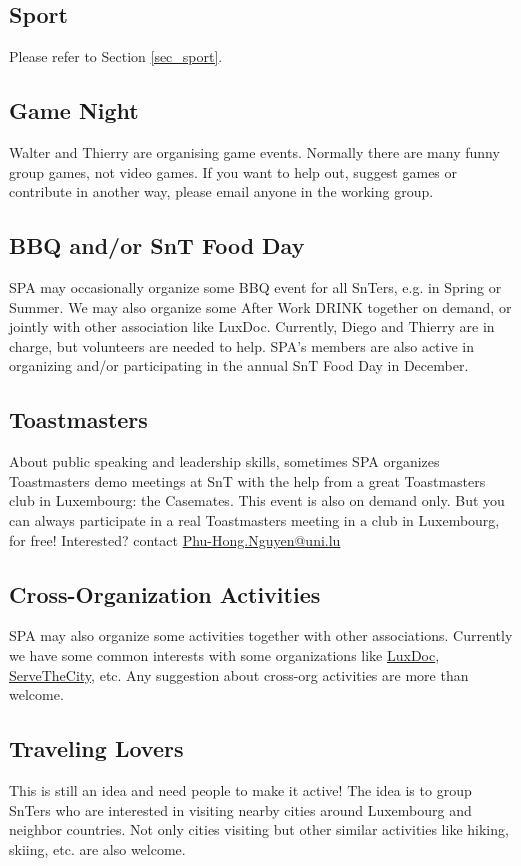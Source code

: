 \subsection{Sport}
Please refer to Section \ref{sec_sport}. 

\subsection{Game Night}
Walter and Thierry are organising game events. 
Normally there are many funny group games, not video games. 
If you want to help out, suggest games or contribute in another way, please email anyone in the working group.

\subsection{BBQ and/or SnT Food Day}
SPA may occasionally organize some BBQ event for all SnTers, e.g. in Spring or Summer. 
We may also organize some After Work DRINK together on demand, or jointly with other association like LuxDoc. 
Currently, Diego and Thierry are in charge, but volunteers are needed to help. 
SPA's members are also active in organizing and/or participating in the annual SnT Food Day in December. 


\subsection{Toastmasters}
About public speaking and leadership skills, sometimes SPA organizes Toastmasters demo meetings at SnT with the help from a great Toastmasters club in Luxembourg: the Casemates. 
This event is also on demand only. 
But you can always participate in a real Toastmasters meeting in a club in Luxembourg, for free!
Interested? contact \href{mailto:Phu-Hong.Nguyen@uni.lu}{Phu-Hong.Nguyen@uni.lu}

\subsection{Cross-Organization Activities}
SPA may also organize some activities together with other associations. 
Currently we have some common interests with some organizations like \href{http://LuxDoc.org}{LuxDoc}, \href{http://servethecity.lu/}{ServeTheCity}, etc. 
Any suggestion about cross-org activities are more than welcome. 

\subsection{Traveling Lovers}
This is still an idea and need people to make it active! 
The idea is to group SnTers who are interested in visiting nearby cities around Luxembourg and neighbor countries. 
Not only cities visiting but other similar activities like hiking, skiing, etc. are also welcome. 